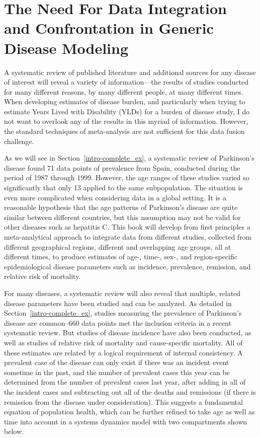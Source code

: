 \section[Need for Confrontation]{The Need For Data Integration and Confrontation in Generic Disease Modeling}

A systematic review of published literature and additional sources for
any disease of interest will reveal a variety of information---the
results of studies conducted for many different reasons, by many
different people, at many different times. When developing estimates
of disease burden, and particularly when trying to estimate Years
Lived with Disability (YLDs) for a burden of disease study, I do not
want to overlook any of the results in this myriad of
information. However, the standard techniques of meta-analysis are
not sufficient for this data fusion challenge.

As we will see in Section~\ref{intro-complete_ex}, a systematic review of Parkinson's disease found 71 data points of prevalence from Spain,
conducted during the period of 1987 through 1999.  However, the age ranges of these
studies varied so significantly that only 13 applied to the
same subpopulation.  The situation is even more complicated when
considering data in a global setting. It is a reasonable hypothesis
that the age patterns of Parkinson's disease are quite similar between different countries, but this assumption may not be valid for other diseases such as hepatitis C.
This book will develop from first principles a
meta-analytical approach to integrate data from different studies,
collected from different geographical regions, different and
overlapping age groups, all at different times, to produce estimates
of age-, time-, sex-, and region-specific epidemiological disease
parameters such as incidence, prevalence, remission, and relative risk
of mortality.

For many diseases, a systematic review will also reveal that multiple,
related disease parameters have been studied and can be analyzed. As
detailed in Section~\ref{intro-complete_ex}, studies measuring the prevalence of 
Parkinson's disease are common--660 data points met the
inclusion criteria in a recent systematic review. But studies of
disease incidence have also been conducted, as well as studies of
relative risk of mortality and cause-specific mortality. All of these
estimates are related by a logical requirement of internal
consistency.  A prevalent case of the disease can only exist if there
was an incident event sometime in the past, and the number of
prevalent cases this year can be determined from the number of
prevalent cases last year, after adding in all of the incident cases
and subtracting out all of the deaths and remissions (if there is
remission from the disease under consideration).  This suggests a
fundamental equation of population health, which can be further
refined to take age as well as time into account in a systems dynamics
model with two compartments shown below.

